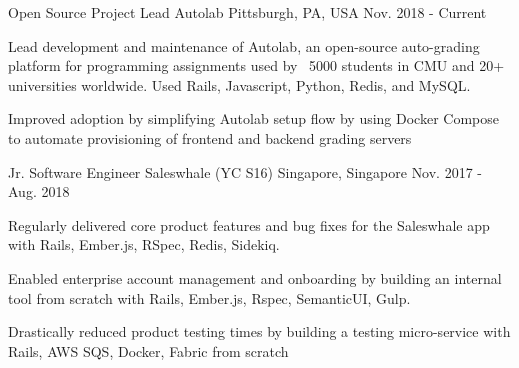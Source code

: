 \begin{cventries}
  \cventry
  {Open Source Project Lead} %
    {Autolab} %
    {Pittsburgh, PA, USA} %
    {Nov. 2018 - Current} %
    {
      \begin{cvitems} %
      \item {Lead development and maintenance of Autolab, an open-source auto-grading platform for programming assignments used by ~5000 students in CMU and 20+ universities worldwide. Used Rails, Javascript, Python, Redis, and MySQL.}
        \item {Improved adoption by simplifying Autolab setup flow by using Docker Compose to automate provisioning of frontend and backend grading servers}
      \end{cvitems}
    }

  \cventry
    {Jr. Software Engineer} %
    {Saleswhale (YC S16)} %
    {Singapore, Singapore} %
    {Nov. 2017 - Aug. 2018} %
    {
      \begin{cvitems} %
      \item { Regularly delivered core product features and bug fixes for the Saleswhale app with Rails, Ember.js, RSpec, Redis, Sidekiq.} %
      \item { Enabled enterprise account management and onboarding by building an internal tool from scratch with Rails, Ember.js, Rspec, SemanticUI, Gulp.} %
      \item { Drastically reduced product testing times by building a testing micro-service with Rails, AWS SQS, Docker, Fabric from scratch } %
      \end{cvitems}
    }


\end{cventries}
